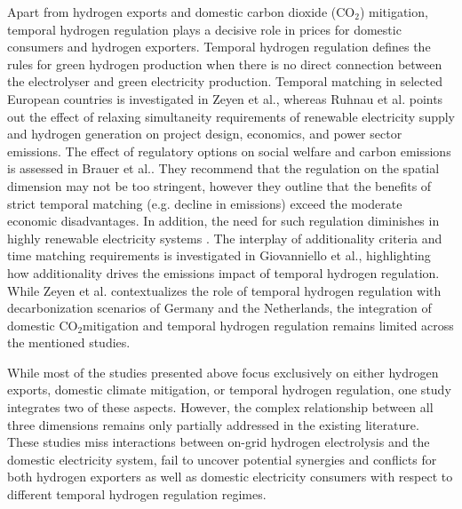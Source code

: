 \documentclass[5p,numafflabel]{elsarticle}
\newcommand{\co}{\ce{CO2}~}
\def\co{CO${}_2${\:}}
\begin{document}
Apart from hydrogen exports and domestic carbon dioxide (CO${}_2$) mitigation, temporal hydrogen regulation plays a decisive role in prices for domestic consumers and hydrogen exporters. 
Temporal hydrogen regulation defines the rules for green hydrogen production when there is no direct connection between the electrolyser and green electricity production.
Temporal matching in selected European countries is investigated in Zeyen et al.\cite{Zeyen2024}, whereas Ruhnau et al.\cite{Ruhnau2023} points out the effect of relaxing simultaneity requirements of renewable electricity supply and hydrogen generation on project design, economics, and power sector emissions.
The effect of regulatory options on social welfare and carbon emissions is assessed in Brauer et al.\cite{Brauer2022}. They recommend that the regulation on the spatial dimension may not be too stringent, however they outline that the benefits of strict temporal matching (e.g. decline in emissions) exceed the moderate economic disadvantages. In addition, the need for such regulation diminishes in highly renewable electricity systems \cite{Brauer2022}.
The interplay of additionality criteria and time matching requirements is investigated in Giovanniello et al.\cite{Giovanniello2024}, highlighting how additionality drives the emissions impact of temporal hydrogen regulation.
While Zeyen et al.\cite{Zeyen2024} contextualizes the role of temporal hydrogen regulation with decarbonization scenarios of Germany and the Netherlands, the integration of domestic \co mitigation and temporal hydrogen regulation remains limited across the mentioned studies.

While most of the studies presented above focus exclusively on either hydrogen exports, domestic climate mitigation, or temporal hydrogen regulation, one study\cite{Muller2024} integrates two of these aspects.
However, the complex relationship between all three dimensions remains only partially addressed in the existing literature.
These studies miss interactions between on-grid hydrogen electrolysis and the domestic electricity system, fail to uncover potential synergies and conflicts for both hydrogen exporters as well as domestic electricity consumers with respect to different temporal hydrogen regulation regimes.
\end{document}
